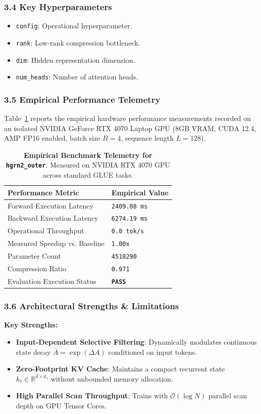 \subsubsection*{3.4 Key Hyperparameters}
\begin{itemize}
    \item \texttt{config}: Operational hyperparameter.
    \item \texttt{rank}: Low-rank compression bottleneck.
    \item \texttt{dim}: Hidden representation dimension.
    \item \texttt{num\_heads}: Number of attention heads.
\end{itemize}

\subsubsection*{3.5 Empirical Performance Telemetry}
Table~\ref{tab:telemetry_hgrn2\_outer} reports the empirical hardware performance measurements recorded on an isolated NVIDIA GeForce RTX 4070 Laptop GPU (8GB VRAM, CUDA 12.4, AMP FP16 enabled, batch size $B=4$, sequence length $L=128$).

\begin{table}[h]
\centering
\small
\caption{\textbf{Empirical Benchmark Telemetry for \texttt{hgrn2\_outer}}. Measured on NVIDIA RTX 4070 GPU across standard GLUE tasks.}
\label{tab:telemetry_hgrn2\_outer}
\begin{tabularx}{\columnwidth}{lX}
\toprule
\textbf{Performance Metric} & \textbf{Empirical Value} \\
\midrule
Forward Execution Latency & \texttt{2409.08 ms} \\
Backward Execution Latency & \texttt{6274.19 ms} \\
Operational Throughput & \texttt{0.0 tok/s} \\
Measured Speedup vs. Baseline & \texttt{1.00x} \\
Parameter Count & \texttt{4518290} \\
Compression Ratio & \texttt{0.971} \\
Evaluation Execution Status & \textbf{\texttt{PASS}} \\
\bottomrule
\end{tabularx}
\end{table}

\subsubsection*{3.6 Architectural Strengths \& Limitations}
\textbf{Key Strengths:}
\begin{itemize}
    \item \textbf{Input-Dependent Selective Filtering}: Dynamically modulates continuous state decay $\bar{A} = \exp(\Delta A)$ conditioned on input tokens.
    \item \textbf{Zero-Footprint KV Cache}: Maintains a compact recurrent state $h_t \in \mathbb{R}^{d \times d_s}$ without unbounded memory allocation.
    \item \textbf{High Parallel Scan Throughput}: Trains with $\mathcal{O}(\log N)$ parallel scan depth on GPU Tensor Cores.
\end{itemize}

